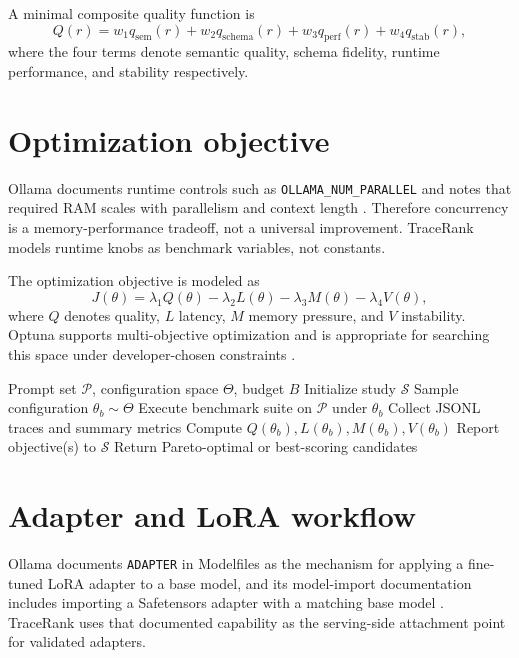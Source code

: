     A minimal composite quality function is
    \begin{equation}
    Q(r)=w_1 q_{\text{sem}}(r)+w_2 q_{\text{schema}}(r)+w_3 q_{\text{perf}}(r)+w_4 q_{\text{stab}}(r),
    \end{equation}
    where the four terms denote semantic quality, schema fidelity, runtime performance, and stability respectively.
    
    \section{Optimization objective}
    Ollama documents runtime controls such as \texttt{OLLAMA\_NUM\_PARALLEL} and notes that required RAM scales with parallelism and context length \cite{ollama_faq}. Therefore concurrency is a memory-performance tradeoff, not a universal improvement. TraceRank models runtime knobs as benchmark variables, not constants.
    
    The optimization objective is modeled as
    \begin{equation}
    J(\theta)=\lambda_1 Q(\theta)-\lambda_2 L(\theta)-\lambda_3 M(\theta)-\lambda_4 V(\theta),
    \end{equation}
    where $Q$ denotes quality, $L$ latency, $M$ memory pressure, and $V$ instability. Optuna supports multi-objective optimization and is appropriate for searching this space under developer-chosen constraints \cite{optuna_multi}.
    
    \begin{algorithm}[H]
    \caption{Offline optimization loop}
    \begin{algorithmic}[1]
    \Require Prompt set $\mathcal{P}$, configuration space $\Theta$, budget $B$
    \State Initialize study $\mathcal{S}$
      \State Sample configuration $\theta_b \sim \Theta$
      \State Execute benchmark suite on $\mathcal{P}$ under $\theta_b$
      \State Collect JSONL traces and summary metrics
      \State Compute $Q(\theta_b), L(\theta_b), M(\theta_b), V(\theta_b)$
      \State Report objective(s) to $\mathcal{S}$
    \EndFor
    \State Return Pareto-optimal or best-scoring candidates
    \end{algorithmic}
    \end{algorithm}
    
    \section{Adapter and LoRA workflow}
    Ollama documents \texttt{ADAPTER} in Modelfiles as the mechanism for applying a fine-tuned LoRA adapter to a base model, and its model-import documentation includes importing a Safetensors adapter with a matching base model \cite{ollama_modelfile,ollama_import}. TraceRank uses that documented capability as the serving-side attachment point for validated adapters.
    
